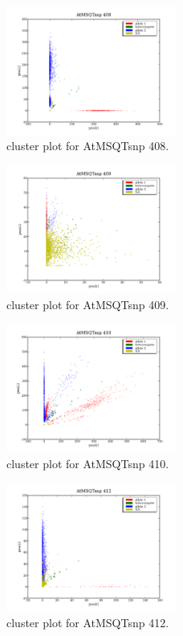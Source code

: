 \begin{figure}[H]
\includegraphics[width=0.5\textwidth]{figures/cluster_plot_AtMSQTsnp_408.png}
\caption{cluster plot for AtMSQTsnp 408.} \label{flAtMSQTsnp408}
\end{figure}
\begin{figure}[H]
\includegraphics[width=0.5\textwidth]{figures/cluster_plot_AtMSQTsnp_409.png}
\caption{cluster plot for AtMSQTsnp 409.} \label{flAtMSQTsnp409}
\end{figure}
\begin{figure}[H]
\includegraphics[width=0.5\textwidth]{figures/cluster_plot_AtMSQTsnp_410.png}
\caption{cluster plot for AtMSQTsnp 410.} \label{flAtMSQTsnp410}
\end{figure}
\begin{figure}[H]
\includegraphics[width=0.5\textwidth]{figures/cluster_plot_AtMSQTsnp_412.png}
\caption{cluster plot for AtMSQTsnp 412.} \label{flAtMSQTsnp412}
\end{figure}
